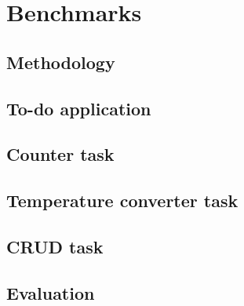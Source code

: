 \chapter{Benchmarks}
\label{chap:walktrough}




\section{Methodology}



\section{To-do application}
\section{Counter task}
\section{Temperature converter task}
\section{CRUD task}

\section{Evaluation}
